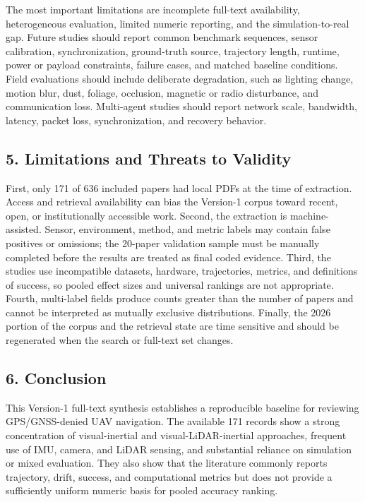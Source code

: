 \documentclass[
  journal]{IEEEtran}
\begin{document}
The most important limitations are incomplete full-text availability,
heterogeneous evaluation, limited numeric reporting, and the
simulation-to-real gap. Future studies should report common benchmark
sequences, sensor calibration, synchronization, ground-truth source,
trajectory length, runtime, power or payload constraints, failure cases,
and matched baseline conditions. Field evaluations should include
deliberate degradation, such as lighting change, motion blur, dust,
foliage, occlusion, magnetic or radio disturbance, and communication
loss. Multi-agent studies should report network scale, bandwidth,
latency, packet loss, synchronization, and recovery behavior.

\subsection{5. Limitations and Threats to
Validity}\label{5-limitations-and-threats-to-validity}

First, only 171 of 636 included papers had local PDFs at the time of
extraction. Access and retrieval availability can bias the Version-1
corpus toward recent, open, or institutionally accessible work. Second,
the extraction is machine-assisted. Sensor, environment, method, and
metric labels may contain false positives or omissions; the 20-paper
validation sample must be manually completed before the results are
treated as final coded evidence. Third, the studies use incompatible
datasets, hardware, trajectories, metrics, and definitions of success,
so pooled effect sizes and universal rankings are not appropriate.
Fourth, multi-label fields produce counts greater than the number of
papers and cannot be interpreted as mutually exclusive distributions.
Finally, the 2026 portion of the corpus and the retrieval state are time
sensitive and should be regenerated when the search or full-text set
changes.

\subsection{6. Conclusion}\label{6-conclusion}

This Version-1 full-text synthesis establishes a reproducible baseline
for reviewing GPS/GNSS-denied UAV navigation. The available 171 records
show a strong concentration of visual-inertial and visual-LiDAR-inertial
approaches, frequent use of IMU, camera, and LiDAR sensing, and
substantial reliance on simulation or mixed evaluation. They also show
that the literature commonly reports trajectory, drift, success, and
computational metrics but does not provide a sufficiently uniform
numeric basis for pooled accuracy ranking.
\end{document}
